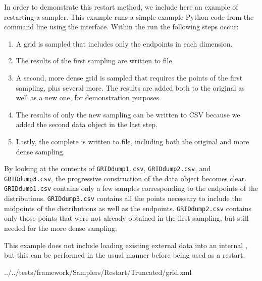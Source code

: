 In order to demonstrate this restart method, we include here an example of restarting a 
sampler.  This example runs a simple example Python code from the command line using the 
interface.  Within the run the following steps occur:
\begin{enumerate}
  \item A grid is sampled that includes only the endpoints in each dimension.
  \item The results of the first sampling are written to file.
  \item A second, more dense grid is sampled that requires the points of the first sampling, plus several
    more.  The results are added both to the original  as well as a new one, for
    demonstration purposes.
  \item The results of only the new sampling can be written to CSV because we added the second data object in
    the last step.
  \item Lastly, the complete  is written to file, including both the original and more
    dense sampling.
\end{enumerate}
By looking at the contents of \texttt{GRIDdump1.csv}, \texttt{GRIDdump2.csv}, and \texttt{GRIDdump3.csv}, the
progressive construction of the data object becomes clear.  \texttt{GRIDdump1.csv} contains only a few samples
corresponding to the endpoints of the distributions.  \texttt{GRIDdump3.csv} contains all the points necessary
to include the midpoints of the distributions as well as the endpoints.  \texttt{GRIDdump2.csv} contains only
those points that were not already obtained in the first sampling, but still needed for the more dense
sampling.

\nb This example does not include loading existing external data into an internal , but
this can be performed in the usual manner before being used as a restart.


\footnotesize

  {../../tests/framework/Samplers/Restart/Truncated/grid.xml}
\normalsize

